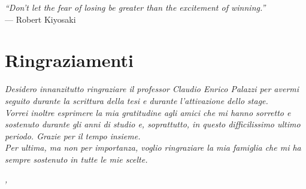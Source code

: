 
\cleardoublepage
{}
{}

\begin{flushright}{
	\slshape    
	``Don’t let the fear of losing be greater than the excitement of winning.''} \\ 
	\medskip
    --- Robert Kiyosaki
\end{flushright}


\bigskip

\begingroup
\let\clearpage\relax
\let\cleardoublepage\relax
\let\cleardoublepage\relax

\chapter*{Ringraziamenti}

\noindent \textit{Desidero innanzitutto ringraziare il professor Claudio Enrico Palazzi per avermi seguito durante la scrittura della tesi e durante l'attivazione dello stage.}\\

\noindent \textit{Vorrei inoltre esprimere la mia gratitudine agli amici che mi hanno sorretto e sostenuto durante gli anni di studio e, soprattutto, in questo difficilissimo ultimo periodo. Grazie per il tempo insieme.}\\

\noindent \textit{Per ultima, ma non per importanza, voglio ringraziare la mia famiglia che mi ha sempre sostenuto in tutte le mie scelte.}\\
\bigskip

\noindent\textit{\myLocation, \myTime}
\hfill \myName

\endgroup


